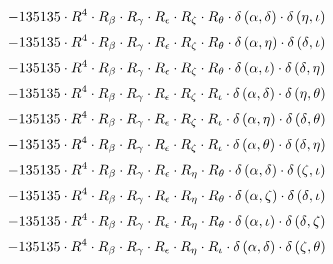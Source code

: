 \begin{subequations}
\begin{gather}
 \\[0.2em] \notag 		 - 135135 \cdot R^{4} \cdot R_{\beta{}} \cdot R_{\gamma{}} \cdot R_{\epsilon{}} \cdot R_{\zeta{}} \cdot R_{\theta{}} \cdot \delta{}\left(\alpha{}, \delta{}\right) \cdot \delta{}\left(\eta{}, \iota{}\right) 
 \\[0.2em] \notag 		 - 135135 \cdot R^{4} \cdot R_{\beta{}} \cdot R_{\gamma{}} \cdot R_{\epsilon{}} \cdot R_{\zeta{}} \cdot R_{\theta{}} \cdot \delta{}\left(\alpha{}, \eta{}\right) \cdot \delta{}\left(\delta{}, \iota{}\right) 
 \\[0.2em] \notag 		 - 135135 \cdot R^{4} \cdot R_{\beta{}} \cdot R_{\gamma{}} \cdot R_{\epsilon{}} \cdot R_{\zeta{}} \cdot R_{\theta{}} \cdot \delta{}\left(\alpha{}, \iota{}\right) \cdot \delta{}\left(\delta{}, \eta{}\right) 
 \\[0.2em] \notag 		 - 135135 \cdot R^{4} \cdot R_{\beta{}} \cdot R_{\gamma{}} \cdot R_{\epsilon{}} \cdot R_{\zeta{}} \cdot R_{\iota{}} \cdot \delta{}\left(\alpha{}, \delta{}\right) \cdot \delta{}\left(\eta{}, \theta{}\right) 
 \\[0.2em] \notag 		 - 135135 \cdot R^{4} \cdot R_{\beta{}} \cdot R_{\gamma{}} \cdot R_{\epsilon{}} \cdot R_{\zeta{}} \cdot R_{\iota{}} \cdot \delta{}\left(\alpha{}, \eta{}\right) \cdot \delta{}\left(\delta{}, \theta{}\right) 
 \\[0.2em] \notag 		 - 135135 \cdot R^{4} \cdot R_{\beta{}} \cdot R_{\gamma{}} \cdot R_{\epsilon{}} \cdot R_{\zeta{}} \cdot R_{\iota{}} \cdot \delta{}\left(\alpha{}, \theta{}\right) \cdot \delta{}\left(\delta{}, \eta{}\right) 
 \\[0.2em] \notag 		 - 135135 \cdot R^{4} \cdot R_{\beta{}} \cdot R_{\gamma{}} \cdot R_{\epsilon{}} \cdot R_{\eta{}} \cdot R_{\theta{}} \cdot \delta{}\left(\alpha{}, \delta{}\right) \cdot \delta{}\left(\zeta{}, \iota{}\right) 
 \\[0.2em] \notag 		 - 135135 \cdot R^{4} \cdot R_{\beta{}} \cdot R_{\gamma{}} \cdot R_{\epsilon{}} \cdot R_{\eta{}} \cdot R_{\theta{}} \cdot \delta{}\left(\alpha{}, \zeta{}\right) \cdot \delta{}\left(\delta{}, \iota{}\right) 
 \\[0.2em] \notag 		 - 135135 \cdot R^{4} \cdot R_{\beta{}} \cdot R_{\gamma{}} \cdot R_{\epsilon{}} \cdot R_{\eta{}} \cdot R_{\theta{}} \cdot \delta{}\left(\alpha{}, \iota{}\right) \cdot \delta{}\left(\delta{}, \zeta{}\right) 
 \\[0.2em] \notag 		 - 135135 \cdot R^{4} \cdot R_{\beta{}} \cdot R_{\gamma{}} \cdot R_{\epsilon{}} \cdot R_{\eta{}} \cdot R_{\iota{}} \cdot \delta{}\left(\alpha{}, \delta{}\right) \cdot \delta{}\left(\zeta{}, \theta{}\right) 

\end{gather}
\end{subequations}
